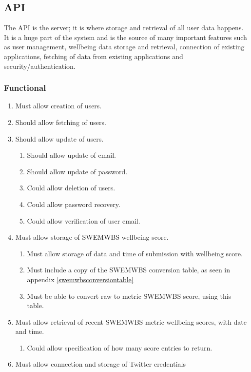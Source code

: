 \documentclass[11pt,openright,a4paper]{report}
\begin{document}
\subsection{API} \label{subsec:apireqs}
The API is the server; it is where storage and retrieval of all user data happens. It is a huge part of the system and is the source of many important features such as user management, wellbeing data storage and retrieval, connection of existing applications, fetching of data from existing applications and security/authentication.

\subsubsection{Functional}
\begin{enumerate}
\item Must allow creation of users.
\item Should allow fetching of users.
\item Should allow update of users.
  \begin{enumerate}
  \item Should allow update of email.
  \item Should allow update of password.
  \item Could allow deletion of users.
  \item Could allow password recovery.
  \item Could allow verification of user email.
  \end{enumerate}
\item Must allow storage of SWEMWBS wellbeing score.
  \begin{enumerate}
  \item Must allow storage of data and time of submission with wellbeing score.
  \item Must include a copy of the SWEMWBS conversion table, as seen in appendix \ref{swemwbsconversiontable}
  \item Must be able to convert raw to metric SWEMWBS score, using this table.
  \end{enumerate}
\item Must allow retrieval of recent SWEMWBS metric wellbeing scores, with date and time.
  \begin{enumerate}
  \item Could allow specification of how many score entries to return.
  \end{enumerate}
\item Must allow connection and storage of Twitter credentials

\end{enumerate}
\end{document}
